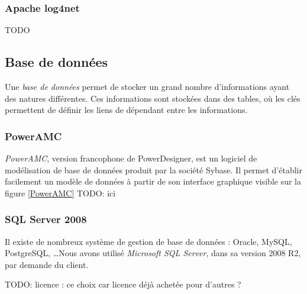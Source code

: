 \subsubsection{Apache log4net}

TODO


\subsection{Base de données}

Une \textit{base de données} permet de stocker un grand nombre d'informations ayant des natures différentes. Ces informations sont stockées dans des tables, où les clés permettent de définir les liens de dépendant entre les informations.


\subsubsection{PowerAMC}

\textit{PowerAMC}, version francophone de PowerDesigner, est un logiciel de modélisation de base de données produit par la société Sybase. Il permet d'établir facilement un modèle de données à partir de son interface graphique visible sur la figure \ref{PowerAMC} TODO: ici


\subsubsection{SQL Server 2008}

Il existe de nombreux système de gestion de base de données : Oracle, MySQL, PostgreSQL, \ldots Nous avons utilisé \textit{Microsoft SQL Server}, dans sa version 2008 R2, par demande du client.

TODO: licence : ce choix car licence déjà achetée pour d'autres ?

